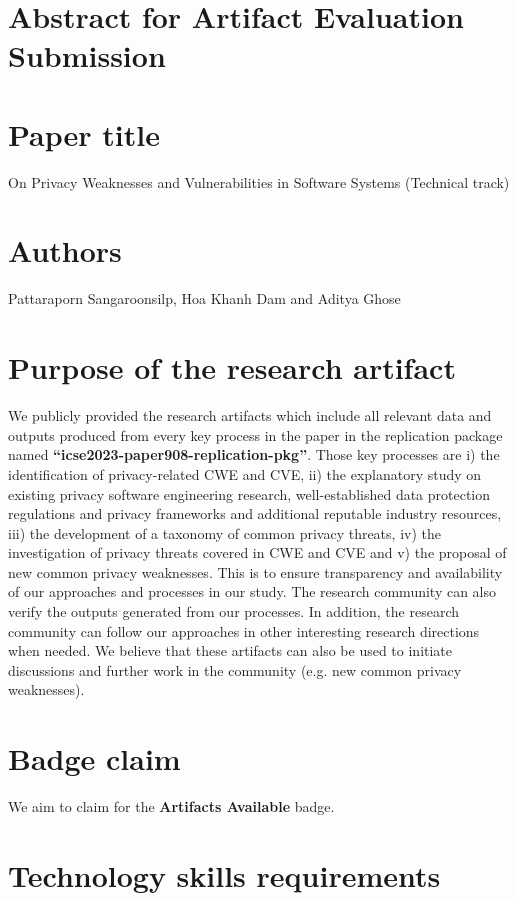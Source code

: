 \documentclass{article}
\begin{document}
	
\section*{Abstract for Artifact Evaluation Submission}
	
\section{Paper title}
On Privacy Weaknesses and Vulnerabilities in Software Systems (Technical track)

\section{Authors}
Pattaraporn Sangaroonsilp, Hoa Khanh Dam and Aditya Ghose

\section{Purpose of the research artifact}

We publicly provided the research artifacts which include all relevant data and outputs produced from every key process in the paper in the replication package named \textbf{``icse2023-paper908-replication-pkg''}. Those key processes are i) the identification of privacy-related CWE and CVE, ii) the explanatory study on existing privacy software engineering research, well-established data protection regulations and privacy frameworks and additional reputable industry resources, iii) the development of a taxonomy of common privacy threats, iv) the investigation of privacy threats covered in CWE and CVE and v) the proposal of new common privacy weaknesses. This is to ensure transparency and availability of our approaches and processes in our study. The research community can also verify the outputs generated from our processes. In addition, the research community can follow our approaches in other interesting research directions when needed. We believe that these artifacts can also be used to initiate discussions and further work in the community (e.g. new common privacy weaknesses). 

\section{Badge claim}

We aim to claim for the \textbf{Artifacts Available} badge.

\section{Technology skills requirements}
\end{document}
